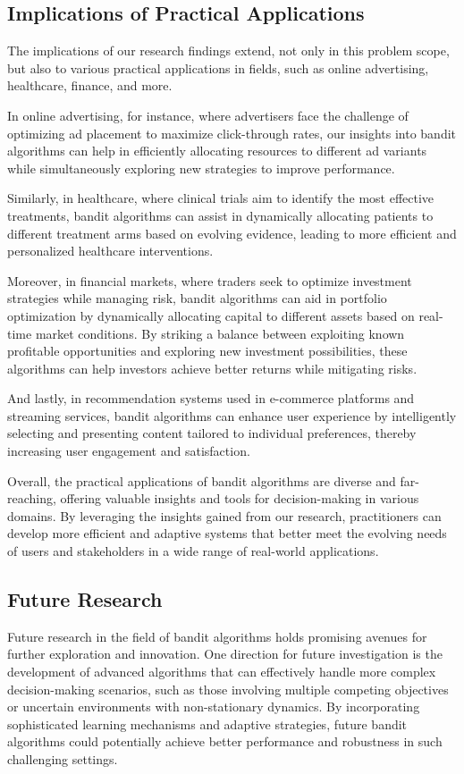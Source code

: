 \documentclass[a4paper, 12pt]{article}
\theoremstyle{definition}
\begin{document}
\subsection{Implications of Practical Applications}
The implications of our research findings extend, not only in this problem scope, but also to various practical applications in fields, such as online advertising, healthcare, finance, and more. 

In online advertising, for instance, where advertisers face the challenge of optimizing ad placement to maximize click-through rates, our insights into bandit algorithms can help in efficiently allocating resources to different ad variants while simultaneously exploring new strategies to improve performance. 

Similarly, in healthcare, where clinical trials aim to identify the most effective treatments, bandit algorithms can assist in dynamically allocating patients to different treatment arms based on evolving evidence, leading to more efficient and personalized healthcare interventions.

Moreover, in financial markets, where traders seek to optimize investment strategies while managing risk, bandit algorithms can aid in portfolio optimization by dynamically allocating capital to different assets based on real-time market conditions. By striking a balance between exploiting known profitable opportunities and exploring new investment possibilities, these algorithms can help investors achieve better returns while mitigating risks. 

And lastly, in recommendation systems used in e-commerce platforms and streaming services, bandit algorithms can enhance user experience by intelligently selecting and presenting content tailored to individual preferences, thereby increasing user engagement and satisfaction.

Overall, the practical applications of bandit algorithms are diverse and far-reaching, offering valuable insights and tools for decision-making in various domains. By leveraging the insights gained from our research, practitioners can develop more efficient and adaptive systems that better meet the evolving needs of users and stakeholders in a wide range of real-world applications.


\subsection{Future Research}
Future research in the field of bandit algorithms holds promising avenues for further exploration and innovation. One direction for future investigation is the development of advanced algorithms that can effectively handle more complex decision-making scenarios, such as those involving multiple competing objectives or uncertain environments with non-stationary dynamics. By incorporating sophisticated learning mechanisms and adaptive strategies, future bandit algorithms could potentially achieve better performance and robustness in such challenging settings.
\end{document}
